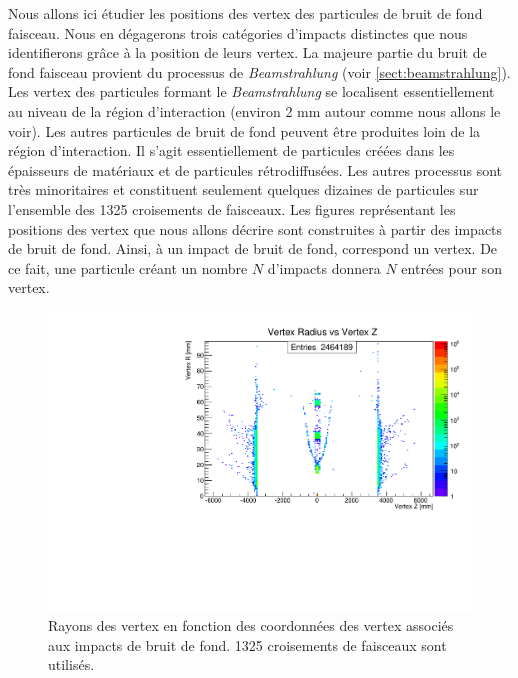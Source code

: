 Nous allons ici \'etudier les positions des vertex des particules de bruit de fond faisceau. Nous en d\'egagerons trois cat\'egories d'impacts distinctes que nous identifierons gr\^ace \`a la position de leurs vertex. La majeure partie du bruit de fond faisceau provient du processus de \textit{Beamstrahlung} (voir \ref{sect:beamstrahlung}). Les vertex des particules formant le \textit{Beamstrahlung} se localisent essentiellement au niveau de la r\'egion d'interaction (environ 2 mm autour comme nous allons le voir). Les autres particules de bruit de fond peuvent \^etre produites loin de la r\'egion d'interaction. Il s'agit essentiellement de particules cr\'e\'ees dans les épaisseurs de mat\'eriaux et de particules r\'etrodiffus\'ees. Les autres processus sont tr\`es minoritaires et constituent seulement quelques dizaines de particules sur l'ensemble des 1325 croisements de faisceaux. Les figures repr\'esentant les positions des vertex que nous allons d\'ecrire sont construites \`a partir des impacts de bruit de fond. Ainsi, \`a un impact de bruit de fond, correspond un vertex. De ce fait, une particule cr\'eant un nombre $N$ d'impacts donnera $N$ entr\'ees pour son vertex.
 
 \medskip

   \begin{figure}[!htb]
    \begin{center}
      \includegraphics[scale=0.60]{./figures/Beamstrahlung/Vertex_Studies/Vertex_R_vs_Vertex_Z_All.pdf}
      \caption{Rayons des vertex en fonction des coordonn\'ees des vertex associ\'es aux impacts de bruit de fond. 1325 croisements de faisceaux sont utilis\'es.}
      \label{fig:Vertex_R_vs_Vertex_Z_All}
    \end{center}
  \end{figure}

